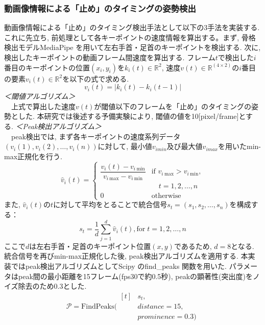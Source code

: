 \documentclass[paper]{ieicej}
\begin{document}
\subsubsection{動画像情報による「止め」のタイミングの姿勢検出}
動画像情報による「止め」のタイミング検出手法として以下の3手法を実装する. これに先立ち, 前処理として各キーポイントの速度情報を算出する。まず, 骨格検出モデルMediaPipe \cite{ref24}を用いて左右手首・足首のキーポイントを検出する. 次に, 検出したキーポイントの動画フレーム間速度を算出する. フレーム$t$で検出した$i$番目のキーポイントの位置$(x_{i},y_{i})$を$k_{i}(t)\in\mathbb{R}^2$, 速度$v(t)\in\mathbb{R}^{(4 \times 2)}$の$i$番目の要素$v_{i}(t)\in\mathbb{R}^2$を以下の式で求める. 
\begin{equation}
  v_{i} (t)=|k_{i}(t)-k_{i}(t-1)|
\end{equation}
\textit{＜閾値アルゴリズム＞}\\
　上式で算出した速度$v(t)$が閾値以下のフレームを「止め」のタイミングの姿勢とした. 本研究では後述する予備実験により, 閾値の値を10[pixel/frame]とする. 
\textit{＜Peak検出アルゴリズム＞}\\
　peak検出では, まず各キーポイントの速度系列データ$(v_{i}(1),v_{i}(2),\dots,v_{i}(n))$に対して, 最小値$v_{i min}$及び最大値$v_{i max}$を用いたmin-max正規化を行う. 
\begin{equation}
  \hat{v}_{i}(t) =
  \begin{cases}
    \dfrac{v_{i}(t) - v_{i\ \mathrm{min}}}
          {v_{i\ \mathrm{max}} - v_{i\ \mathrm{min}}}
      & \text{if } v_{i\ \mathrm{max}} > v_{i\ \mathrm{min}}, \\
      & \quad t = 1,2,\dots,n \\[6pt]
    0 & \text{otherwise}
  \end{cases}
\end{equation}
また, $\hat{v}_{i}(t)$の$t$に対して平均をとることで統合信号$s_{t}=(s_{1},s_{2},\dots,s_{n} )$を構成する：
\begin{equation}
  s_{t}=\frac{1}{d}\sum_{j=1}^{d}\hat{v}_{i}(t),\text{for}\;t = 1,2,\dots,n
\end{equation}
ここで$d$は左右手首・足首のキーポイント位置$(x,y)$であるため, $d=8$となる. 統合信号を再びmin-max正規化した後, peak検出アルゴリズムを適用する. 本実装ではpeak検出アルゴリズムとしてScipy \cite{ref27} のfind\_peaks 関数を用いた. パラメータはpeak間の最小距離を15フレーム(fps30で約0.5秒), peakの顕著性(突出度)をノイズ除去のため0.3とした. 
\begin{equation}
  \mathcal{P} = \mathrm{FindPeaks}(
  \begin{aligned}[t]
    & s_{t}, \\
    & distance=15, \\
    & prominence=0.3)
  \end{aligned}
\end{equation}
\end{document}
